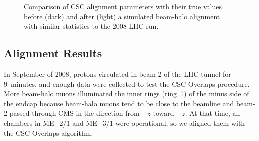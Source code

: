 \begin{figure}
 \hfill {} \hfill {} \hfill
\caption{Comparison of CSC alignment parameters with their true values before (dark) and after (light) a simulated beam-halo alignment with similar statistics to the 2008 LHC run. \label{fig:overlaps_mc}}
\end{figure}

\subsection{Alignment Results}

In September of 2008, protons circulated in beam-2 of the LHC tunnel
for 9~minutes, and enough data were collected to test the CSC Overlaps
procedure.  More beam-halo muons illuminated the inner rings (ring~1)
of the minus side of the endcap because beam-halo muons tend to be close to
the beamline and beam-2 passed through CMS in the direction from $-z$ toward $+z$.  At
that time, all chambers in ME$-$2/1 and ME$-$3/1 were operational, so
we aligned them with the CSC Overlaps algorithm.

